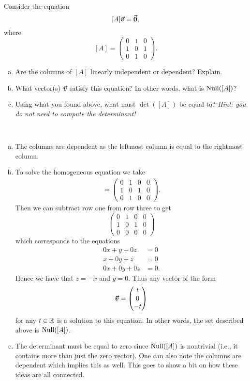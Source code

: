 \documentclass[12pt]{article} %
\begin{document}
\newpage
\begin{problem}
Consider the equation
\[
[A]\boldsymbol{\vec{v}} = \boldsymbol{\vec{0}},
\]
where
\[
[A] = \begin{pmatrix} 0 & 1 & 0 \\ 1 & 0 & 1 \\ 0 & 1 & 0 \end{pmatrix}.
\]
\begin{enumerate}[(a)]
    \item Are the columns of $[A]$ linearly independent or dependent? Explain.
    \item What vector(s) $\boldsymbol{\vec{v}}$ satisfy this equation? In other words, what is $\mathrm{Null}([A])$?
    \item Using what you found above, what must $\det([A])$ be equal to? \emph{Hint: you do not need to compute the determinant!}
\end{enumerate}
\end{problem}
\begin{solution}~
\begin{enumerate}[(a)]
    \item The columns are dependent as the leftmost column is equal to the rightmost column.
    \item To solve the homogeneous equation we take
    \begin{align*}
        [M]=\left(\begin{array}{ccc|c}
            0 & 1 & 0 &0 \\
            1 & 0 & 1 &0\\
            0 & 1 & 0 &0
        \end{array}\right).
    \end{align*}
    Then we can subtract row one from row three to get
    \[
    \left(\begin{array}{ccc|c}
            0 & 1 & 0 &0\\
            1 & 0 & 1 &0\\
            0 & 0 & 0 &0
        \end{array}\right)
    \]
    which corresponds to the equations
    \begin{align*}
        0x+y+0z&=0\\
        x+0y+z&=0\\
        0x+0y+0z&=0.
    \end{align*}
    Hence we have that $z=-x$ and $y=0$.  Thus any vector of the form
    \[
    \boldsymbol{\vec{v}} = \begin{pmatrix} t \\ 0 \\ -t \end{pmatrix}
    \]
    for any $t\in \mathbb{R}$ is a solution to this equation. In other words, the set described above is $\mathrm{Null}([A])$.
    \item The determinant must be equal to zero since $\mathrm{Null}([A])$ is nontrivial (i.e., it contains more than just the zero vector). One can also note the columns are dependent which implies this as well.  This goes to show a bit on how these ideas are all connected.
\end{enumerate}
\end{solution}
\end{document}
